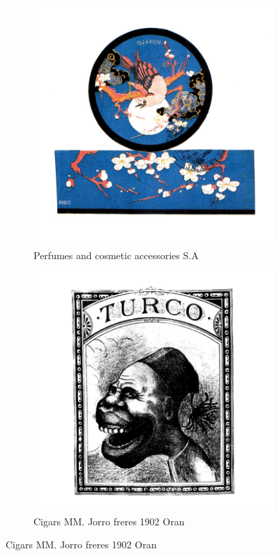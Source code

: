 \begin{figure}[h]
  \begin{subfigure}{.45\textwidth}
    \centering
    \includegraphics[width=.5\linewidth]{images/supplement/trademarks/french/15_9}
    \caption[]{Perfumes and cosmetic accessories S.A}
    \label{fig:trademarks:french:15.9}
  \end{subfigure}\hfill
  \begin{subfigure}{.45\textwidth}
    \centering
    \includegraphics[width=.5\linewidth]{images/supplement/trademarks/french/15_29}
    \caption[]{Cigars MM. Jorro freres 1902 Oran}
    \label{fig:trademarks:french:15.29}
  \end{subfigure}
\end{figure}

